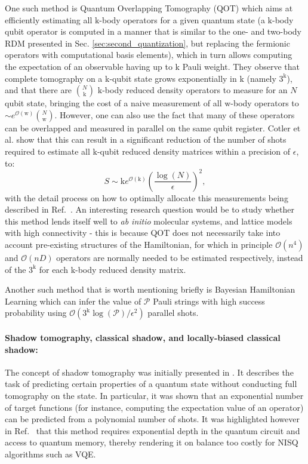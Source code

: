 One such method is Quantum Overlapping Tomography (QOT) \cite{Cotler2020} which aims at efficiently estimating all $\mathrm{k}$-body operators for a given quantum state (a $\mathrm{k}$-body qubit operator is computed in a manner that is similar to the one- and two-body RDM presented in Sec. \ref{sec:second_quantization}, but replacing the fermionic operators with computational basis elements), which in turn allows computing the expectation of an observable having up to $\mathrm{k}$ Pauli weight. They observe that complete tomography on a $\mathrm{k}$-qubit state grows exponentially in $\mathrm{k}$ \cite{ODonnell2016, Haah2017} (namely $3^{\mathrm{k}}$), and that there are $\binom{N}{\mathrm{k}}$  $\mathrm{k}$-body reduced density operators to measure for an $N$ qubit state, bringing the cost of a naive measurement of all $\mathrm{w}$-body operators to $\sim e^{\mathcal{O}(\mathrm{w})}\binom{N}{\mathrm{w}}$. However, one can also use the fact that many of these operators can be overlapped and measured in parallel on the same qubit register. Cotler et al. \cite{Cotler2020} show that this can result in a significant reduction of the number of shots required to estimate all $\mathrm{k}$-qubit reduced density matrices within a precision of $\epsilon$, to:
\begin{equation}
    S \sim \mathrm{k}e^{\mathcal{O}(\mathrm{k})} \left( \frac{\log(N)}{\epsilon} \right)^2,
\end{equation}
with the detail process on how to optimally allocate this measurements being described in Ref.~\cite{Cotler2020}. An interesting research question would be to study whether this method lends itself well to \textit{ab initio} molecular systems, and lattice models with high connectivity - this is because QOT does not necessarily take into account pre-existing structures of the Hamiltonian, for which in principle $\mathcal{O}(n^4)$ and $\mathcal{O}(nD)$  operators are normally needed to be estimated respectively, instead of the $3^{\mathrm{k}}$ for each $\mathrm{k}$-body reduced density matrix.

Another such method that is worth mentioning briefly is Bayesian Hamiltonian Learning \cite{Evans2019} which can infer the value of $\mathcal{P}$ Pauli strings with high success probability using $\mathcal{O}(3^{\mathrm{k}} \log(\mathcal{P}) / \epsilon^2) $ parallel shots. 
\paragraph{Shadow tomography, classical shadow, and locally-biased classical shadow:} The concept of shadow tomography was initially presented in \cite{Aaronson2019, Aaronson2019_prooceed}. It describes the task of predicting certain properties of a quantum state without conducting full tomography on the state. In particular, it was shown that an exponential number of target functions (for instance, computing the expectation value of an operator) can be predicted from a polynomial number of shots. It was highlighted however in Ref.~\cite{Huang2020} that this method requires exponential depth in the quantum circuit and access to quantum memory, thereby rendering it on balance too costly for NISQ algorithms such as VQE. 

